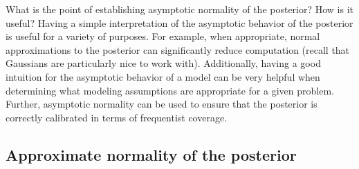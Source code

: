 \documentclass[12pt]{article}
\begin{document}
What is the point of establishing asymptotic normality of the posterior? How is it useful? Having a simple interpretation of the asymptotic behavior of the posterior is useful for a variety of purposes. For example, when appropriate, normal approximations to the posterior can significantly reduce computation (recall that Gaussians are particularly nice to work with). Additionally, having a good intuition for the asymptotic behavior of a model can be very helpful when determining what modeling assumptions are appropriate for a given problem. Further, asymptotic normality can be used to ensure that the posterior is correctly calibrated in terms of frequentist coverage. 

\subsection{Approximate normality of the posterior}
\end{document}
